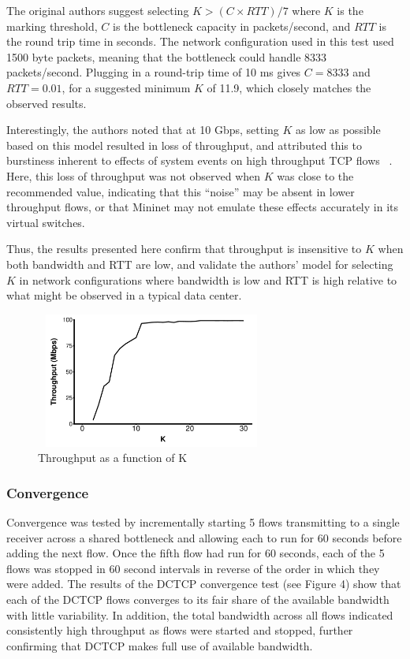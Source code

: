 The original authors suggest selecting $K > (C \times RTT) / 7$ where $K$ is the marking threshold, $C$ is the bottleneck capacity in packets/second, and $RTT$ is the round trip time in seconds. The network configuration used in this test used 1500 byte packets, meaning that the bottleneck could handle 8333 packets/second. Plugging in a round-trip time of 10 ms gives $C = 8333$ and $RTT = 0.01$, for a suggested minimum $K$ of 11.9, which closely matches the observed results.

Interestingly, the authors noted that at 10 Gbps, setting $K$ as low as possible based on this model resulted in loss of throughput, and attributed this to burstiness inherent to effects of system events on high throughput TCP flows ~\cite{alizadeh_data_2010}. Here, this loss of throughput was not observed when $K$ was close to the recommended value, indicating that this ``noise'' may be absent in lower throughput flows, or that Mininet may not emulate these effects accurately in its virtual switches. 

Thus, the results presented here confirm that throughput is insensitive to $K$ when both bandwidth and RTT are low, and validate the authors' model for selecting $K$ in network configurations where bandwidth is low and RTT is high relative to what might be observed in a typical data center.

\begin{figure}
\includegraphics[height=1.75in,width=3in]{k_throughput_delay}
\caption{Throughput as a function of K}
\end{figure}

\subsubsection{Convergence}

Convergence was tested by incrementally starting 5 flows transmitting to a single receiver across a shared bottleneck and allowing each to run for 60 seconds before adding the next flow. Once the fifth flow had run for 60 seconds, each of the 5 flows was stopped in 60 second intervals in reverse of the order in which they were added. The results of the DCTCP convergence test (see Figure 4) show that each of the DCTCP flows converges to its fair share of the available bandwidth with little variability. In addition, the total bandwidth across all flows indicated consistently high throughput as flows were started and stopped, further confirming that DCTCP makes full use of available bandwidth.


